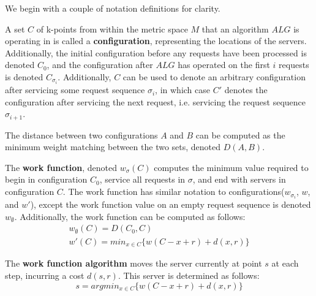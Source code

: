 
We begin with a couple of notation definitions for clarity.

\begin{definition}
    A set $C$ of k-points from within the metric space $M$ that an algorithm $ALG$ is operating in is called a \textbf{configuration}, representing the locations of the servers. Additionally, the initial configuration before any requests have been processed is denoted $C_0$, and the configuration after $ALG$ has operated on the first $i$ requests is denoted $C_{\sigma_i}$. Additionally, $C$ can be used to denote an arbitrary configuration after servicing some request sequence $\sigma_i$, in which case $C'$ denotes the configuration after servicing the next request, i.e. servicing the request sequence $\sigma_{i+1}$.
\end{definition}

\begin{definition}
    The distance between two configurations $A$ and $B$ can be computed as the minimum weight matching between the two sets, denoted $D(A, B)$.
\end{definition}

\begin{definition}
    The \textbf{work function}, denoted $w_\sigma(C)$ computes the minimum value required to begin in configuration $C_0$, service all requests in $\sigma$, and end with servers in configuration $C$. The work function has similar notation to configurations($w_{\sigma_i}$, $w$, and $w'$), except the work function value on an empty request sequence is denoted $w_\emptyset$. Additionally, the work function can be computed as follows:
    \begin{equation*}
        \begin{gathered}
            w_\emptyset(C) = D(C_0, C) \\
            w'(C) = min_{x \in C} \{ w(C - x + r) + d(x, r)\}
        \end{gathered}
    \end{equation*}
\end{definition}

\begin{definition}
    The \textbf{work function algorithm} moves the server currently at point $s$ at each step, incurring a cost $d(s,r)$. This server is determined as follows:
    \begin{equation*}
        s = argmin_{x \in C} \{ w(C-x+r) + d(x,r)\}
    \end{equation*}
\end{definition}